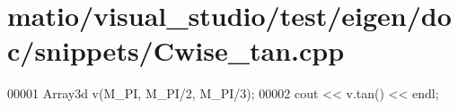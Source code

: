 \hypertarget{matio_2visual__studio_2test_2eigen_2doc_2snippets_2_cwise__tan_8cpp_source}{}\section{matio/visual\+\_\+studio/test/eigen/doc/snippets/\+Cwise\+\_\+tan.cpp}
\label{matio_2visual__studio_2test_2eigen_2doc_2snippets_2_cwise__tan_8cpp_source}

\begin{DoxyCode}
00001 Array3d v(M\_PI, M\_PI/2, M\_PI/3);
00002 cout << v.tan() << endl;
\end{DoxyCode}
